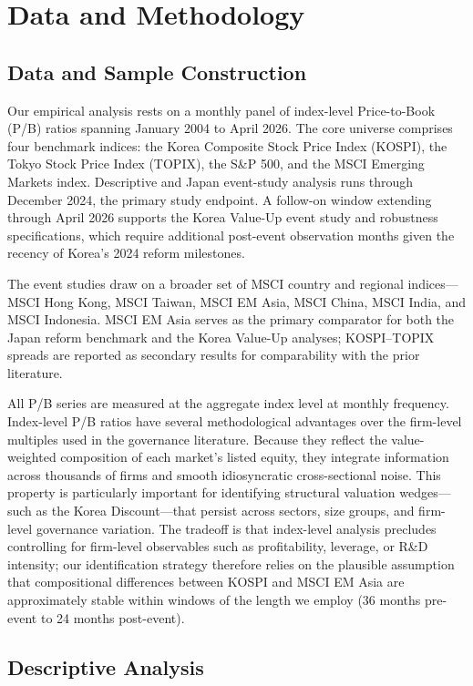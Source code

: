 \section{Data and Methodology}

\subsection{Data and Sample Construction}

Our empirical analysis rests on a monthly panel of index-level Price-to-Book (P/B) ratios spanning January 2004 to April 2026. The core universe comprises four benchmark indices: the Korea Composite Stock Price Index (KOSPI), the Tokyo Stock Price Index (TOPIX), the S\&P 500, and the MSCI Emerging Markets index. Descriptive and Japan event-study analysis runs through December 2024, the primary study endpoint. A follow-on window extending through April 2026 supports the Korea Value-Up event study and robustness specifications, which require additional post-event observation months given the recency of Korea's 2024 reform milestones.

The event studies draw on a broader set of MSCI country and regional indices---MSCI Hong Kong, MSCI Taiwan, MSCI EM Asia, MSCI China, MSCI India, and MSCI Indonesia. MSCI EM Asia serves as the primary comparator for both the Japan reform benchmark and the Korea Value-Up analyses; KOSPI--TOPIX spreads are reported as secondary results for comparability with the prior literature.

All P/B series are measured at the aggregate index level at monthly frequency. Index-level P/B ratios have several methodological advantages over the firm-level multiples used in the governance literature. Because they reflect the value-weighted composition of each market's listed equity, they integrate information across thousands of firms and smooth idiosyncratic cross-sectional noise. This property is particularly important for identifying structural valuation wedges---such as the Korea Discount---that persist across sectors, size groups, and firm-level governance variation. The tradeoff is that index-level analysis precludes controlling for firm-level observables such as profitability, leverage, or R\&D intensity; our identification strategy therefore relies on the plausible assumption that compositional differences between KOSPI and MSCI EM Asia are approximately stable within windows of the length we employ (36 months pre-event to 24 months post-event).

\subsection{Descriptive Analysis}

